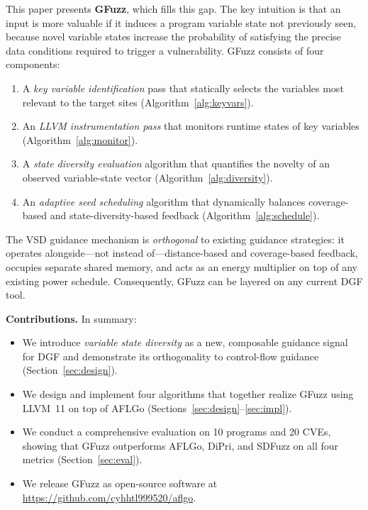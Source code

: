 \documentclass[preprint,12pt,3p]{elsarticle}
\begin{document}
This paper presents \textbf{GFuzz}, which fills this gap.  The key intuition
is that an input is more valuable if it induces a program variable state
not previously seen, because novel variable states increase the probability of
satisfying the precise data conditions required to trigger a vulnerability.
GFuzz consists of four components:
\begin{enumerate}
  \item A \emph{key variable identification} pass that statically selects the
    variables most relevant to the target sites (Algorithm~\ref{alg:keyvars}).
  \item An \emph{LLVM instrumentation pass} that monitors runtime states of
    key variables (Algorithm~\ref{alg:monitor}).
  \item A \emph{state diversity evaluation} algorithm that quantifies the
    novelty of an observed variable-state vector (Algorithm~\ref{alg:diversity}).
  \item An \emph{adaptive seed scheduling} algorithm that dynamically balances
    coverage-based and state-diversity-based feedback
    (Algorithm~\ref{alg:schedule}).
\end{enumerate}

The VSD guidance mechanism is \emph{orthogonal} to existing guidance
strategies: it operates alongside—not instead of—distance-based and
coverage-based feedback, occupies separate shared memory, and acts as an
energy multiplier on top of any existing power schedule.  Consequently, GFuzz
can be layered on any current DGF tool.

\textbf{Contributions.} In summary:
\begin{itemize}
  \item We introduce \emph{variable state diversity} as a new, composable
    guidance signal for DGF and demonstrate its orthogonality to control-flow
    guidance (Section~\ref{sec:design}).
  \item We design and implement four algorithms that together realize GFuzz
    using LLVM~11 on top of AFLGo (Sections~\ref{sec:design}--\ref{sec:impl}).
  \item We conduct a comprehensive evaluation on 10 programs and 20 CVEs,
    showing that GFuzz outperforms AFLGo, DiPri, and SDFuzz on all four
    metrics (Section~\ref{sec:eval}).
  \item We release GFuzz as open-source software at
    \url{https://github.com/cyhhtl999520/aflgo}.
\end{itemize}
\end{document}
